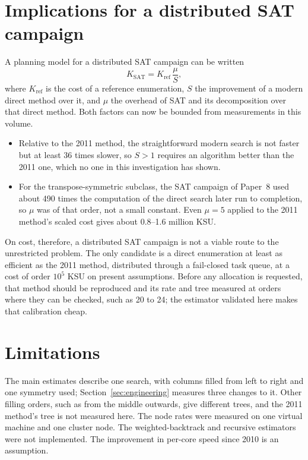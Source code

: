 \section{Implications for a distributed SAT campaign}
\label{sec:sat}
A planning model for a distributed SAT campaign can be written
\[
K_{\mathrm{SAT}}=K_{\mathrm{ref}}\,\frac{\mu}{S},
\]
where $K_{\mathrm{ref}}$ is the cost of a reference enumeration, $S$ the improvement of a modern direct
method over it, and $\mu$ the overhead of SAT and its decomposition over that direct method. Both
factors can now be bounded from measurements in this volume.
\begin{itemize}
\item Relative to the 2011 method, the straightforward modern search is not faster but at least 36
times slower, so $S>1$ requires an algorithm better than the 2011 one, which no one in this
investigation has shown.
\item For the transpose-symmetric subclass, the SAT campaign of Paper~8 used about 490 times the
computation of the direct search later run to completion, so $\mu$ was of that order, not a small constant. Even $\mu=5$ applied to
the 2011 method's scaled cost gives about 0.8--1.6 million KSU.
\end{itemize}
On cost, therefore, a distributed SAT campaign is not a viable route to the unrestricted problem. The
only candidate is a direct enumeration at least as efficient as the 2011 method, distributed through a
fail-closed task queue, at a cost of order $10^5$ KSU on present assumptions. Before any allocation is
requested, that method should be reproduced and its rate and tree measured at orders where they can be
checked, such as 20 to 24; the estimator validated here makes that calibration cheap.

\section{Limitations}
\label{sec:limits}
The main estimates describe one search, with columns filled from left to right and one symmetry used;
Section~\ref{sec:engineering} measures three changes to it. Other
filling orders, such as from the middle outwards, give different trees, and the 2011 method's tree is
not measured here. The node rates were measured on one virtual machine and one cluster node. The weighted-backtrack and recursive estimators were not implemented. The improvement in
per-core speed since 2010 is an assumption.
